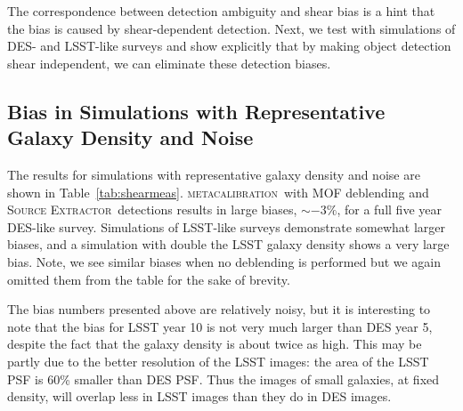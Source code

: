 \documentclass[iop, twocolappendix, appendixfloats, numberedappendix, apj]{hackemulateapj}
\newcommand{\mcal}{\textsc{metacalibration}}
\newcommand{\sx}{\textsc{Source Extractor}}
\begin{document}
The correspondence between detection ambiguity and shear bias is a hint that
the bias is caused by shear-dependent detection. Next, we test with simulations
of DES- and LSST-like surveys and show explicitly that by making object
detection shear independent, we can eliminate these detection biases.


\subsection{Bias in Simulations with Representative Galaxy Density and Noise}
\label{sec:realbias}

The results for simulations with representative galaxy density and noise are
shown in Table~\ref{tab:shearmeas}.  \mcal\ with MOF deblending and \sx\
detections results in large biases, $\sim-3\%$, for a full five year
DES-like survey. Simulations of LSST-like surveys demonstrate somewhat larger
biases, and a simulation with double the LSST galaxy density shows a very large
bias.  Note, we see similar biases when no deblending is performed but we again
omitted them from the table for the sake of brevity.

The bias numbers presented above are relatively noisy, but it is interesting to
note that the bias for LSST year 10 is not very much larger than DES year 5,
despite the fact that the galaxy density is about twice as high.  This may be
partly due to the better resolution of the LSST images: the area of the LSST
PSF is 60\% smaller than DES PSF.  Thus the images of small galaxies, at fixed
density, will overlap less in LSST images than they do in DES images.
\end{document}
